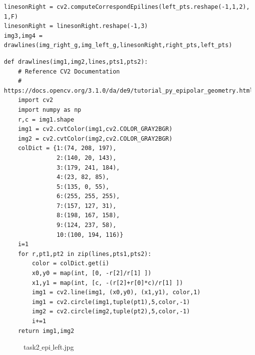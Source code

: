 \documentclass[12pt]{article}
\newenvironment{QandA}
{
	\begin{enumerate}[label=\normalfont\arabic*.,leftmargin=2em,rightmargin=2em]\normalfont
	}
	{
	\end{enumerate}
}
\newenvironment{answered}{\setlength{\parindent}{1em}\par\normalfont}{}
\begin{document}
\begin{QandA}
{\begin{enumerate}
{\begin{answered}
\begin{verbatim}
linesonRight = cv2.computeCorrespondEpilines(left_pts.reshape(-1,1,2), 1,F)
linesonRight = linesonRight.reshape(-1,3)
img3,img4 = drawlines(img_right_g,img_left_g,linesonRight,right_pts,left_pts)
\end{verbatim}
\begin{verbatim}
def drawlines(img1,img2,lines,pts1,pts2):
    # Reference CV2 Documentation
    # https://docs.opencv.org/3.1.0/da/de9/tutorial_py_epipolar_geometry.html
    import cv2
    import numpy as np
    r,c = img1.shape
    img1 = cv2.cvtColor(img1,cv2.COLOR_GRAY2BGR)
    img2 = cv2.cvtColor(img2,cv2.COLOR_GRAY2BGR)
    colDict = {1:(74, 208, 197),
               2:(140, 20, 143),
               3:(179, 241, 184),
               4:(23, 82, 85),
               5:(135, 0, 55),
               6:(255, 255, 255),
               7:(157, 127, 31),
               8:(198, 167, 158),
               9:(124, 237, 58),
               10:(100, 194, 116)}
    i=1
    for r,pt1,pt2 in zip(lines,pts1,pts2):
        color = colDict.get(i)
        x0,y0 = map(int, [0, -r[2]/r[1] ])
        x1,y1 = map(int, [c, -(r[2]+r[0]*c)/r[1] ])
        img1 = cv2.line(img1, (x0,y0), (x1,y1), color,1)
        img1 = cv2.circle(img1,tuple(pt1),5,color,-1)
        img2 = cv2.circle(img2,tuple(pt2),5,color,-1)
        i+=1
    return img1,img2
\end{verbatim}
			\begin{figure}
		\centering
  			\caption{task2$\_$epi$\_$left.jpg}
  		\label{epi-left}
	\end{figure}
				\begin{figure}
		\centering

\end{figure}
\end{answered}}
\end{enumerate}}
\end{QandA}
\end{document}
